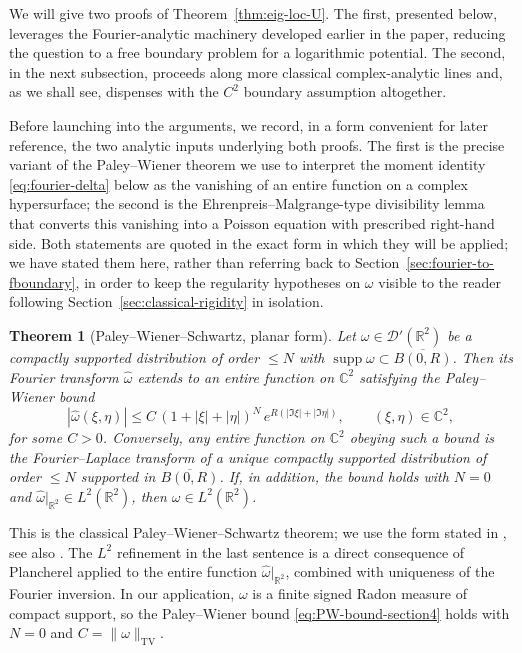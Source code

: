 \documentclass[a4paper,11pt,reqno]{amsart}
\numberwithin{equation}{section}
\theoremstyle{plain} %
\newtheorem{theorem}{Theorem}
\theoremstyle{definition} %
\theoremstyle{remark}
\newcommand{\R}{\mathbb{R}}
\newcommand{\C}{\mathbb{C}}
\begin{document}
We will give two proofs of Theorem~\ref{thm:eig-loc-U}. The first, presented
below, leverages the Fourier-analytic machinery developed earlier in the
paper, reducing the question to a free boundary problem for a logarithmic
potential. The second, in the next subsection, proceeds along more
classical complex-analytic lines and, as we shall see, dispenses with the
$C^2$ boundary assumption altogether.

Before launching into the arguments, we record, in a form convenient for
later reference, the two analytic inputs underlying both proofs. The first is
the precise variant of the Paley--Wiener theorem we use to interpret the
moment identity \eqref{eq:fourier-delta} below as the vanishing of an entire
function on a complex hypersurface; the second is the
Ehrenpreis--Malgrange-type divisibility lemma that converts this vanishing
into a Poisson equation with prescribed right-hand side. Both statements are
quoted in the exact form in which they will be applied; we have stated them
here, rather than referring back to Section~\ref{sec:fourier-to-fboundary},
in order to keep the regularity hypotheses on $\omega$ visible to the
reader following Section~\ref{sec:classical-rigidity} in isolation.

\begin{theorem}[Paley--Wiener--Schwartz, planar form]\label{thm:PW-section4}
Let $\omega\in\mathcal D'(\R^2)$ be a compactly supported distribution of
order $\le N$ with $\operatorname{supp}\omega\subset \overline{B(0,R)}$.
Then its Fourier transform $\widehat\omega$ extends to an entire function
on $\C^2$ satisfying the Paley--Wiener bound
\begin{equation}\label{eq:PW-bound-section4}
|\widehat\omega(\xi,\eta)|\le C\,(1+|\xi|+|\eta|)^N\,e^{R(|\Im\xi|+|\Im\eta|)},
\qquad (\xi,\eta)\in\C^2,
\end{equation}
for some $C>0$. Conversely, any entire function on $\C^2$ obeying such a
bound is the Fourier--Laplace transform of a unique compactly supported
distribution of order $\le N$ supported in $\overline{B(0,R)}$. If, in
addition, the bound holds with $N=0$ and $\widehat\omega|_{\R^2}\in
L^2(\R^2)$, then $\omega\in L^2(\R^2)$.
\end{theorem}

This is the classical Paley--Wiener--Schwartz theorem; we use the form
stated in \cite[Theorem~7.3.1]{Hormander-PDE1}, see also \cite[\S 9.3]{Folland}.
The $L^2$ refinement in the last sentence is a direct consequence of
Plancherel applied to the entire function $\widehat\omega|_{\R^2}$, combined
with uniqueness of the Fourier inversion. In our application, $\omega$ is
a finite signed Radon measure of compact support, so the Paley--Wiener
bound \eqref{eq:PW-bound-section4} holds with $N=0$ and $C=\|\omega\|_{\mathrm{TV}}$.
\end{document}
